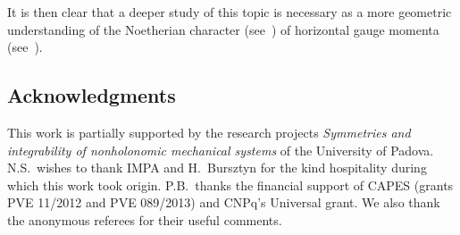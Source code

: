 \documentclass[pdftex]{sigma}
\numberwithin{equation}{section}
\begin{document}
It is then clear that a deeper study of this topic is necessary as a more
geometric understanding of the Noetherian character (see~\cite{FSG2008, FSG2009})
of horizontal gauge momenta (see~\cite{BS2016}).

\subsection*{Acknowledgments}

This work is partially supported by the research projects
{\it Symmetries and integrability of nonholonomic mechanical systems} of the University of Padova.
N.S.~wishes to thank IMPA and H.~Bursztyn for the kind hospitality during which this work took origin.  P.B.~thanks the f\/inancial support of CAPES (grants PVE 11/2012 and PVE 089/2013) and CNPq's Universal grant. We also thank the anonymous referees for their useful comments.
\end{document}

